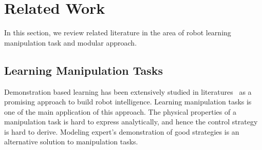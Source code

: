 \section{Related Work}
\label{sec:related}
In this section, we review related literature in the area of robot learning manipulation task and modular approach.



\subsection{Learning Manipulation Tasks}
Demonstration based learning has been extensively studied in literatures~\cite{calinon2007learning,dillmann2004teaching,kulic2012incremental} as a promising approach to build robot intelligence. %
Learning manipulation tasks is one of the main application of this approach. The physical properties of a manipulation task is hard to express analytically, and hence the control strategy is hard to derive. Modeling expert's demonstration of good strategies is an alternative solution to manipulation tasks.


